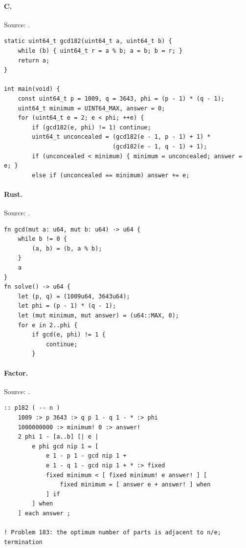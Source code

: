 \paragraph{C.} Source: .
\begin{lstlisting}
static uint64_t gcd182(uint64_t a, uint64_t b) {
    while (b) { uint64_t r = a % b; a = b; b = r; }
    return a;
}

int main(void) {
    const uint64_t p = 1009, q = 3643, phi = (p - 1) * (q - 1);
    uint64_t minimum = UINT64_MAX, answer = 0;
    for (uint64_t e = 2; e < phi; ++e) {
        if (gcd182(e, phi) != 1) continue;
        uint64_t unconcealed = (gcd182(e - 1, p - 1) + 1) *
                               (gcd182(e - 1, q - 1) + 1);
        if (unconcealed < minimum) { minimum = unconcealed; answer = e; }
        else if (unconcealed == minimum) answer += e;
\end{lstlisting}

\paragraph{Rust.} Source: .
\begin{lstlisting}
fn gcd(mut a: u64, mut b: u64) -> u64 {
    while b != 0 {
        (a, b) = (b, a % b);
    }
    a
}
fn solve() -> u64 {
    let (p, q) = (1009u64, 3643u64);
    let phi = (p - 1) * (q - 1);
    let (mut minimum, mut answer) = (u64::MAX, 0);
    for e in 2..phi {
        if gcd(e, phi) != 1 {
            continue;
        }
\end{lstlisting}

\paragraph{Factor.} Source: .
\begin{lstlisting}
:: p182 ( -- n )
    1009 :> p 3643 :> q p 1 - q 1 - * :> phi
    1000000000 :> minimum! 0 :> answer!
    2 phi 1 - [a..b] [| e |
        e phi gcd nip 1 = [
            e 1 - p 1 - gcd nip 1 +
            e 1 - q 1 - gcd nip 1 + * :> fixed
            fixed minimum < [ fixed minimum! e answer! ] [
                fixed minimum = [ answer e + answer! ] when
            ] if
        ] when
    ] each answer ;

! Problem 183: the optimum number of parts is adjacent to n/e; termination
\end{lstlisting}


